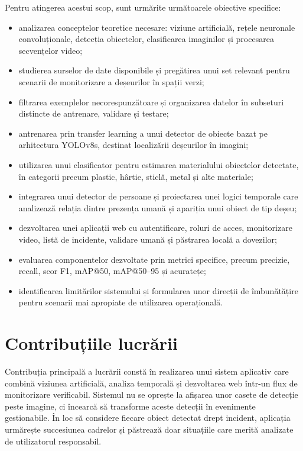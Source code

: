 Pentru atingerea acestui scop, sunt urmărite următoarele obiective specifice:

\begin{itemize}
    \item analizarea conceptelor teoretice necesare: viziune artificială, rețele neuronale convoluționale, detecția obiectelor, clasificarea imaginilor și procesarea secvențelor video;
    \item studierea surselor de date disponibile și pregătirea unui set relevant pentru scenarii de monitorizare a deșeurilor în spații verzi;
    \item filtrarea exemplelor necorespunzătoare și organizarea datelor în subseturi distincte de antrenare, validare și testare;
    \item antrenarea prin transfer learning a unui detector de obiecte bazat pe arhitectura YOLOv8s, destinat localizării deșeurilor în imagini;
    \item utilizarea unui clasificator pentru estimarea materialului obiectelor detectate, în categorii precum plastic, hârtie, sticlă, metal și alte materiale;
    \item integrarea unui detector de persoane și proiectarea unei logici temporale care analizează relația dintre prezența umană și apariția unui obiect de tip deșeu;
    \item dezvoltarea unei aplicații web cu autentificare, roluri de acces, monitorizare video, listă de incidente, validare umană și păstrarea locală a dovezilor;
    \item evaluarea componentelor dezvoltate prin metrici specifice, precum precizie, recall, scor F1, mAP@50, mAP@50--95 și acuratețe;
    \item identificarea limitărilor sistemului și formularea unor direcții de îmbunătățire pentru scenarii mai apropiate de utilizarea operațională.
\end{itemize}

\section*{Contribuțiile lucrării}
{}

Contribuția principală a lucrării constă în realizarea unui sistem aplicativ care combină viziunea artificială, analiza temporală și dezvoltarea web într-un flux de monitorizare verificabil. Sistemul nu se oprește la afișarea unor casete de detecție peste imagine, ci încearcă să transforme aceste detecții în evenimente gestionabile. În loc să considere fiecare obiect detectat drept incident, aplicația urmărește succesiunea cadrelor și păstrează doar situațiile care merită analizate de utilizatorul responsabil.

